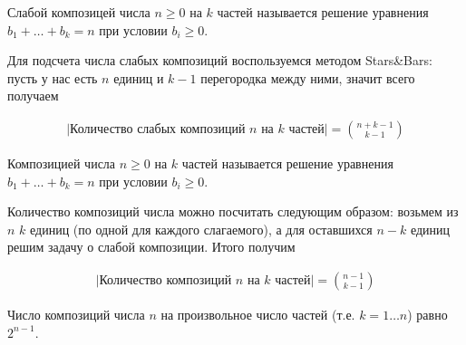 
\begin{definition}
  Слабой композицей числа \(n \ge 0\) на \(k\) частей называется решение
  уравнения \(b_{1} + \dotsc + b_{k} = n\) при условии \(b_{i} \ge 0\).
\end{definition}

Для подсчета числа слабых композиций воспользуемся методом Stars\&Bars: пусть у
нас есть \(n\) единиц и \(k - 1\) перегородка между ними, значит всего получаем

\begin{align*}
  \Big|
    \text{Количество слабых композиций } n \text{ на } k \text{ частей}
  \Big|= \binom{n + k - 1}{k - 1}
\end{align*}

\begin{definition}
  Композицией числа \(n \ge 0\) на \(k\) частей называется решение уравнения
  \(b_{1} + \dotsc + b_{k} = n\) при условии \(b_{i} \ge 0\).
\end{definition}

Количество композиций числа можно посчитать следующим образом: возьмем из \(n\)
\(k\) единиц (по одной для каждого слагаемого), а для оставшихся \(n - k\)
единиц решим задачу о слабой композиции. Итого получим

\begin{align*}
  \Big|
    \text{Количество композиций } n \text{ на } k \text{ частей}
  \Big| = \binom{n - 1}{k - 1}
\end{align*}

\begin{remark}
  Число композиций числа \(n\) на произвольное число частей
  (т.е. \(k = 1 \dots n\)) равно \(2^{n - 1}\).
\end{remark}
